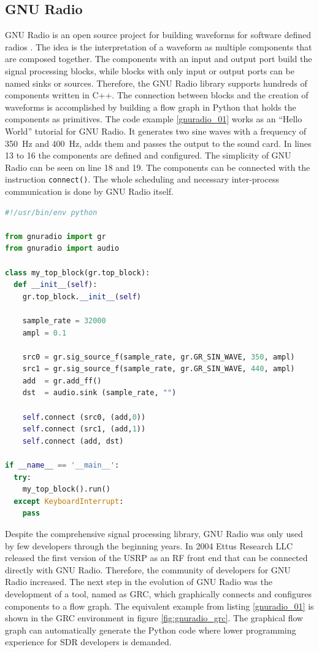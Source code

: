 \subsection{GNU Radio}
\label{GNURadio}

GNU Radio is an open source project for building waveforms for software defined radios \cite{gnu_radio_art}. The idea is the interpretation of a waveform as multiple components that are composed together. The components with an input and output port build the signal processing blocks, while blocks with only input or output ports can be named sinks or sources. Therefore, the GNU Radio library supports hundreds of components written in C++. The connection between blocks and the creation of waveforms is accomplished by building a flow graph in Python that holds the components as primitives. The code example \ref{gnuradio_01} works as an ``Hello World'' tutorial for GNU Radio. It generates two sine waves with a frequency of \SI{350}{Hz} and \SI{400}{Hz}, adds them and passes the output to the sound card. In lines 13 to 16 the components are defined and configured. The simplicity of GNU Radio can be seen on line 18 and 19. The components can be connected with the instruction \texttt{connect()}. The whole scheduling and necessary inter-process communication is done by GNU Radio itself. 

\begin{lstlisting}[language=Python,columns=flexible,caption=Dial tone example in GNU Radio,label=gnuradio_01]
#!/usr/bin/env python
 
from gnuradio import gr
from gnuradio import audio

class my_top_block(gr.top_block):
  def __init__(self):
    gr.top_block.__init__(self)

    sample_rate = 32000
    ampl = 0.1

    src0 = gr.sig_source_f(sample_rate, gr.GR_SIN_WAVE, 350, ampl)
    src1 = gr.sig_source_f(sample_rate, gr.GR_SIN_WAVE, 440, ampl)
    add  = gr.add_ff()
    dst  = audio.sink (sample_rate, "")
        
    self.connect (src0, (add,0))
    self.connect (src1, (add,1))
    self.connect (add, dst)

if __name__ == '__main__':
  try:
    my_top_block().run()
  except KeyboardInterrupt:
    pass        
\end{lstlisting}

Despite the comprehensive signal processing library, GNU Radio was only used by few developers through the beginning years. In 2004 Ettus Research LLC released the first version of the USRP as an RF front end that can be connected directly with GNU Radio. Therefore, the community of developers for GNU Radio increased. The next step in the evolution of GNU Radio was the development of a tool, named as \ac{GRC}, which graphically connects and configures components to a flow graph. The equivalent example from listing \ref{gnuradio_01} is shown in the \ac{GRC} environment in figure \ref{fig:gnuradio_grc}. The graphical flow graph can automatically generate the Python code where lower programming experience for SDR developers is demanded. 

